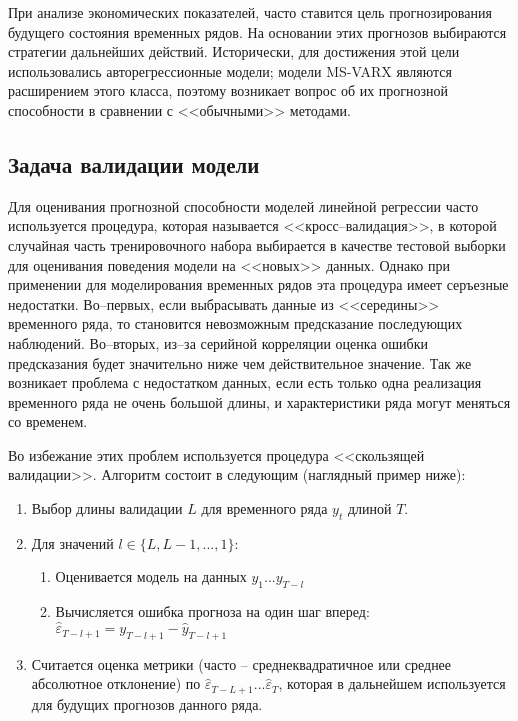 \documentclass[a4paper,14pt]{extreport}
\begin{document}
	При анализе экономических показателей, часто ставится цель прогнозирования будущего состояния временных рядов. На основании этих прогнозов выбираются стратегии дальнейших действий. Исторически, для достижения этой цели использовались авторегрессионные модели; модели MS-VARX являются расширением этого класса, поэтому возникает вопрос об их прогнозной способности в сравнении с <<обычными>> методами.
	
	\subsection{Задача валидации модели}
	
	Для оценивания прогнозной способности моделей линейной регрессии часто используется процедура, которая называется <<кросс--валидация>>, в которой случайная часть тренировочного набора выбирается в качестве тестовой выборки для оценивания поведения модели на <<новых>> данных. Однако при применении для моделирования временных рядов эта процедура имеет серъезные недостатки. Во--первых, если выбрасывать данные из <<середины>> временного ряда, то становится невозможным предсказание последующих наблюдений. Во--вторых, из--за серийной корреляции оценка ошибки предсказания будет значительно ниже чем действительное значение. Так же возникает проблема с недостатком данных, если есть только одна реализация временного ряда не очень большой длины, и характеристики ряда могут меняться со временем.
	
	Во избежание этих проблем используется процедура <<скользящей валидации>>. Алгоритм состоит в следующим (наглядный пример ниже):
	\begin{enumerate}
		\item Выбор длины валидации $L$ для временного ряда  $y_t$ длиной $T$.
		\item Для значений $l \in \{L, L-1, ..., 1\}$:
		\begin{enumerate}
			\item Оценивается модель на данных $y_1 ... y_{T-l}$
			\item Вычисляется ошибка прогноза на один шаг вперед: 
			$\hat{\varepsilon}_{T-l+1} = y_{T-l+1} - \hat{y}_{T-l+1}$
		\end{enumerate}
		\item Считается оценка метрики (часто -- среднеквадратичное или среднее абсолютное отклонение) по $\hat{\varepsilon}_{T-L+1} ... \hat{\varepsilon}_{T}$, которая в дальнейшем используется для будущих прогнозов данного ряда.
	\end{enumerate}
	
\end{document}
